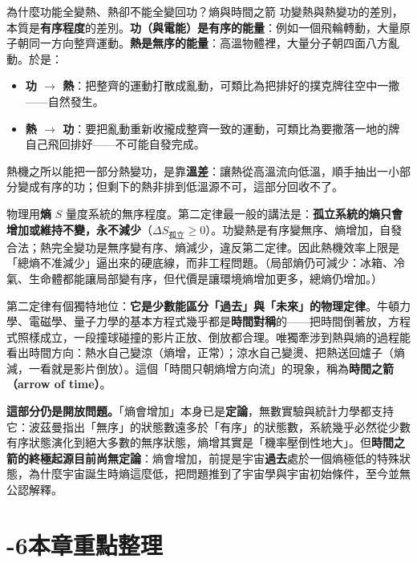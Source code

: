 \documentclass[11pt]{article}
\begin{document}
\begin{延伸框}{為什麼功能全變熱、熱卻不能全變回功？熵與時間之箭}
功變熱與熱變功的差別，本質是\textbf{有序程度}的差別。\textbf{功（與電能）是有序的能量}：例如一個飛輪轉動，大量原子朝同一方向整齊運動。\textbf{熱是無序的能量}：高溫物體裡，大量分子朝四面八方亂動。於是：
\begin{itemize}\setlength{\itemsep}{1pt}
\item \textbf{功 $\rightarrow$ 熱}：把整齊的運動打散成亂動，可類比為把排好的撲克牌往空中一撒——自然發生。
\item \textbf{熱 $\rightarrow$ 功}：要把亂動重新收攏成整齊一致的運動，可類比為要撒落一地的牌自己飛回排好——不可能自發完成。
\end{itemize}
熱機之所以能把一部分熱變功，是靠\textbf{溫差}：讓熱從高溫流向低溫，順手抽出一小部分變成有序的功；但剩下的熱非排到低溫源不可，這部分回收不了。

物理用\textbf{熵} $S$ 量度系統的無序程度。第二定律最一般的講法是：\textbf{孤立系統的熵只會增加或維持不變，永不減少}（$\Delta S_{\text{孤立}}\ge 0$）。功變熱是有序變無序、熵增加，自發合法；熱完全變功是無序變有序、熵減少，違反第二定律。因此熱機效率上限是「總熵不准減少」逼出來的硬底線，而非工程問題。（局部熵仍可減少：冰箱、冷氣、生命體都能讓局部變有序，但代價是讓環境熵增加更多，總熵仍增加。）

第二定律有個獨特地位：\textbf{它是少數能區分「過去」與「未來」的物理定律}。牛頓力學、電磁學、量子力學的基本方程式幾乎都是\textbf{時間對稱}的——把時間倒著放，方程式照樣成立，一段撞球碰撞的影片正放、倒放都合理。唯獨牽涉到熱與熵的過程能看出時間方向：熱水自己變涼（熵增，正常）；涼水自己變燙、把熱送回爐子（熵減，一看就是影片倒放）。這個「時間只朝熵增方向流」的現象，稱為\textbf{時間之箭（arrow of time）}。

\textbf{這部分仍是開放問題。}「熵會增加」本身已是\textbf{定論}，無數實驗與統計力學都支持它：波茲曼指出「無序」的狀態數遠多於「有序」的狀態數，系統幾乎必然從少數有序狀態演化到絕大多數的無序狀態，熵增其實是「機率壓倒性地大」。但\textbf{時間之箭的終極起源目前尚無定論}：熵會增加，前提是宇宙\textbf{過去}處於一個熵極低的特殊狀態，為什麼宇宙誕生時熵這麼低，把問題推到了宇宙學與宇宙初始條件，至今並無公認解釋。
\end{延伸框}

\section*{-6\quad 本章重點整理}
\end{document}
